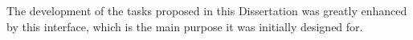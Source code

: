 \par The development of the tasks proposed in this Dissertation was greatly enhanced by this interface, which is the main purpose it was initially designed for.



